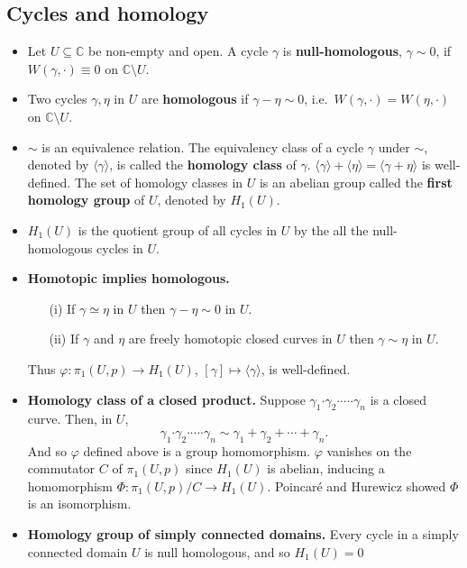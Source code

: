 \documentclass{article}
\newenvironment{topic}[1]{%
{\subsection{#1}}%
\begin{itemize}%
}{%
\end{itemize}%
}
\newcommand{\theorem}[1]{\item {\bf #1.}}
\newcommand{\corollary}[1]{\item {\bf #1.}}
\newcommand{\lemma}[1]{\item {\bf #1.}}
\newcommand{\term}[1]{{\bf #1}}
\newcommand{\remark}{\item}
\newcommand{\curveproduct}{\boldsymbol{\cdot}}
\begin{document}
\begin{topic}{Cycles and homology}
\remark Let $U \subseteq \mathbb{C}$ be non-empty and open. A cycle $\gamma$ is \term{null-homologous}, $\gamma \sim 0$, if $W(\gamma, \cdot) \equiv 0$ on $\mathbb{C} \setminus U$.

\remark Two cycles $\gamma, \eta$ in $U$ are \term{homologous} if $\gamma - \eta \sim 0$, i.e.\ $W(\gamma, \cdot) = W(\eta, \cdot)$ on $\mathbb{C} \setminus U$.

\remark $\sim$ is an equivalence relation. The equivalency class of a cycle $\gamma$ under $\sim$, denoted by $\langle \gamma \rangle$, is called the \term{homology class} of $\gamma$. $\langle \gamma \rangle + \langle \eta \rangle = \langle \gamma + \eta \rangle$ is well-defined. The set of homology classes in $U$ is an abelian group called the \term{first homology group} of $U$, denoted by $H_1(U)$.

\remark $H_1(U)$ is the quotient group of all cycles in $U$ by the all the null-homologous cycles in $U$.

\theorem{Homotopic implies homologous} \begin{enumerate}
\item[(i)] If $\gamma \simeq \eta$ in $U$ then $\gamma - \eta \sim 0$ in $U$.
\item[(ii)] If $\gamma$ and $\eta$ are freely homotopic closed curves in $U$ then $\gamma \sim \eta$ in $U$.
\end{enumerate}
Thus $\varphi : \pi_1(U, p) \to H_1(U)$, $[\gamma] \mapsto \langle \gamma \rangle$, is well-defined.

\lemma{Homology class of a closed product} Suppose $\gamma_1 \curveproduct \gamma_2 \curveproduct \cdots \curveproduct \gamma_n$ is a closed curve. Then, in $U$, $$\gamma_1 \curveproduct \gamma_2 \curveproduct \cdots \curveproduct \gamma_n \sim \gamma_1 + \gamma_2 + \cdots + \gamma_n.$$
And so $\varphi$ defined above is a group homomorphism. $\varphi$ vanishes on the commutator $C$ of $\pi_1(U, p)$ since $H_1(U)$ is abelian, inducing a homomorphism $\Phi : \pi_1(U, p)/C \to H_1(U)$. Poincar\'{e} and Hurewicz showed $\Phi$ is an isomorphism.

\corollary{Homology group of simply connected domains} Every cycle in a simply connected domain $U$ is null homologous, and so $H_1(U) = 0$ 

\end{topic}
\end{document}

